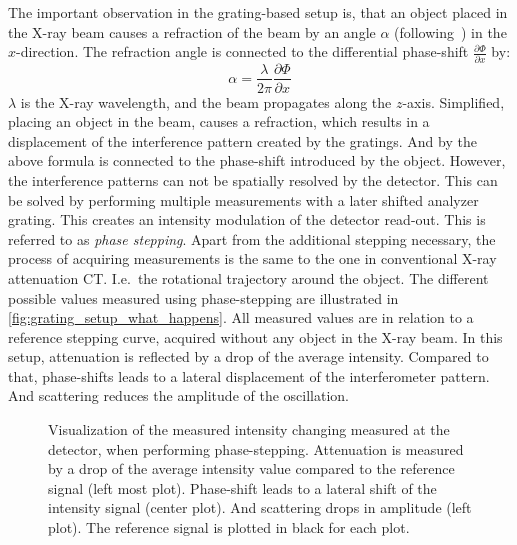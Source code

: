 The important observation in the grating-based setup is, that an object placed in the X-ray beam
causes a refraction of the beam by an angle \(\alpha\) (following~\cite{donath_inverse_2009}) in the
\(x\)-direction. The refraction angle is connected to the differential phase-shift \(\frac{\partial
	\Phi}{\partial x}\) by:
\begin{equation}
	\alpha = \frac{\lambda}{2 \pi} \frac{\partial \Phi}{\partial x}
\end{equation}
\(\lambda\) is the X-ray wavelength, and the beam propagates along the \(z\)-axis.
Simplified, placing an object in the beam, causes a refraction, which results in a displacement of
the interference pattern created by the gratings. And by the above formula is connected to the
phase-shift introduced by the object. However, the interference patterns can not be spatially
resolved by the detector. This can be solved by performing multiple measurements with a later
shifted analyzer grating. This creates an intensity modulation of the detector read-out. This is
referred to as \textit{phase stepping}. Apart from the additional stepping necessary, the process of
acquiring measurements is the same to the one in conventional X-ray attenuation CT\@. I.e.\ the
rotational trajectory around the object. The different possible values measured using phase-stepping
are illustrated in \autoref{fig:grating_setup_what_happens}. All measured values are in relation to
a reference stepping curve, acquired without any object in the X-ray beam. In this setup,
attenuation is reflected by a drop of the average intensity. Compared to that, phase-shifts leads to
a lateral displacement of the interferometer pattern. And scattering reduces the amplitude of the
oscillation.

\begin{figure}
	\centering
	\caption{Visualization of the measured intensity changing measured at the detector, when
		performing phase-stepping. Attenuation is measured by a drop of the average
		intensity value compared to the reference signal (left most plot). Phase-shift leads
		to a lateral shift of the intensity signal (center plot). And scattering drops in
		amplitude (left plot). The reference signal is plotted in black for each plot.}%
	\label{fig:grating_setup_what_happens}
\end{figure}


